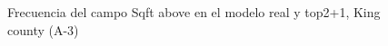 \begin{figure}[H]
    \centering
    
    \caption{Frecuencia del campo Sqft above en el modelo real y top2+1, King county (A-3)}
    \label{frecuency-top2+1-sqft above}
\end{figure}